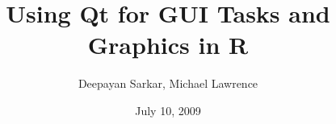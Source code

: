 \usepackage{times}
\usepackage[T1]{fontenc}

\title{Using Qt for GUI Tasks and Graphics in R}

\author{Deepayan Sarkar, Michael Lawrence}
\date{July 10, 2009}




\usepackage{Sweave}
\usepackage{SweaveBeamer}
\usepackage{alltt}
\usepackage{amsmath}
\usepackage{amsfonts}
\usepackage{amssymb}
\usepackage{amsthm}
\usepackage{bm}
\usepackage{graphicx}
\usepackage{url}
\usepackage{hyperref}


\newcommand{\R}{\Emph{R}\xspace}
\newcommand{\SPLUS}{\Emph{S-PLUS}}
\newcommand{\Emph}[1]{\emph{\color{Scode}#1}}
\newcommand{\trans}{\ensuremath{^\prime}}


\newcommand{\lattice}{\code{lattice}}
\newcommand{\Rpackage}[1]{\code{#1}}
\newcommand{\Rfunction}[1]{\code{#1()}}
\newcommand{\class}[1]{\textit{``#1''}}




